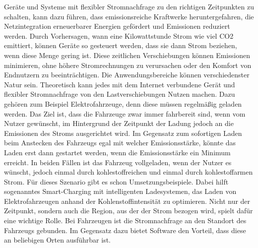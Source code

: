 Geräte und Systeme mit flexibler Stromnachfrage zu den richtigen Zeitpunkten zu schalten, kann dazu führen, dass emissionsreiche Kraftwerke heruntergefahren, die Netzintegration erneuerbarer Energien gefördert und Emissionen reduziert werden.
Durch Vorhersagen, wann eine Kilowattstunde Strom wie viel CO2 emittiert, können Geräte so gesteuert werden, dass sie dann Strom beziehen, wenn diese Menge gering ist.
Diese zeitlichen Verschiebungen können Emissionen minimieren, ohne höhere Stromrechnungen zu verursachen oder den Komfort von Endnutzern zu beeinträchtigen.
Die Anwendungsbereiche können verschiedenster Natur sein.
Theoretisch kann jedes mit dem Internet verbundene Gerät und flexibler Stromnachfrage von den Lastverschiebungen Nutzen machen.
Dazu gehören zum Beispiel Elektrofahrzeuge, denn diese müssen regelmäßig geladen werden.
Das Ziel ist, dass die Fahrzeuge zwar immer fahrbereit sind, wenn vom Nutzer gewünscht, im Hintergrund der Zeitpunkt der Ladung jedoch an die Emissionen des Stroms ausgerichtet wird.
Im Gegensatz zum sofortigen Laden beim Anstecken des Fahrzeugs egal mit welcher Emissionsstärke, könnte das Laden erst dann gestartet werden, wenn die Emissionsstärke ein Minimum erreicht.
In beiden Fällen ist das Fahrzeug vollgeladen, wenn der Nutzer es wünscht, jedoch einmal durch kohlestoffreichen und einmal durch kohlestoffarmen Strom.
Für dieses Szenario gibt es schon Umsetzungsbeispiele.
Dabei hilft sogenanntes \glqq Smart-Charging\grqq{} mit intelligenten Ladesystemen, das Laden von Elektrofahrzeugen anhand der Kohlenstoffintensität zu optimieren.
Nicht nur der Zeitpunkt, sondern auch die Region, aus der der Strom bezogen wird, spielt dafür eine wichtige Rolle.
Bei Fahrzeugen ist die Stromnachfrage an den Standort des Fahrzeugs gebunden.
Im Gegensatz dazu bietet Software den Vorteil, dass diese an beliebigen Orten ausführbar ist.

